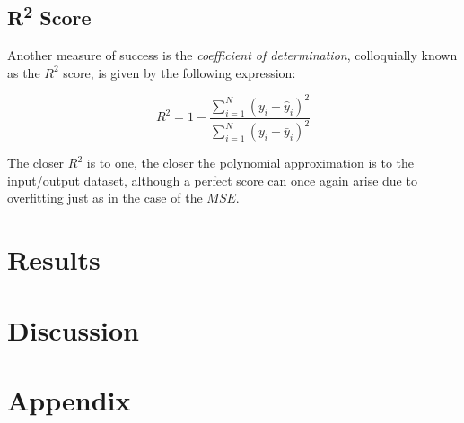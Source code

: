 \documentclass[a4paper,10pt,english]{article}
\begin{document}
	\subsection*{R\textsuperscript{2} Score}
	
	Another measure of success is the \textit{coefficient of determination}, colloquially known as the $R^2$ score, is given by the following expression:
	
	\begin{equation}
	R^2 = 1 - \frac{\sum_{i=1}^N (y_i - \hat{y}_i)^2 }{\sum_{i=1}^N (y_i - \bar{y}_i)^2 }
	\end{equation}
	
	The closer $R^2$ is to one, the closer the polynomial approximation is to the input/output dataset, although a perfect score can once again arise due to overfitting just as in the case of the $MSE$.
		
\section*{Results}
\label{sec:results}

\section*{Discussion}
\label{sec:discussion}

\newpage

\section*{Appendix}
\label{sec:appendix}

{}

	
\end{document}
